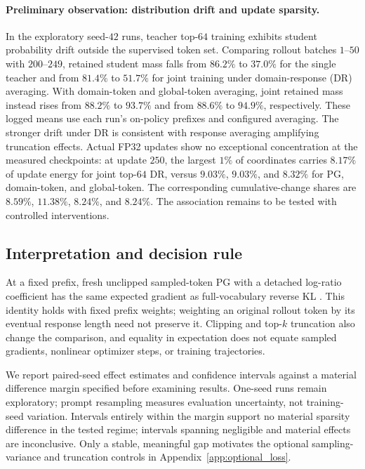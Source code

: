 \paragraph{Preliminary observation: distribution drift and update sparsity.}
In the exploratory seed-$42$ runs, teacher top-$64$ training exhibits
student probability drift outside the supervised token set. Comparing
rollout batches $1$--$50$ with $200$--$249$, retained student mass falls
from $86.2\%$ to $37.0\%$ for the single teacher and from $81.4\%$ to
$51.7\%$ for joint training under domain-response (DR) averaging.
With domain-token and global-token averaging, joint retained mass instead
rises from $88.2\%$ to $93.7\%$ and from $88.6\%$ to $94.9\%$,
respectively. These logged means use each run's on-policy prefixes and
configured averaging. The stronger drift under DR is consistent with
response averaging amplifying truncation effects. Actual FP32 updates
show no exceptional concentration at the measured checkpoints: at update
$250$, the largest $1\%$ of coordinates carries $8.17\%$ of update energy
for joint top-$64$ DR, versus $9.03\%$, $9.03\%$, and $8.32\%$ for PG,
domain-token, and global-token. The corresponding cumulative-change
shares are $8.59\%$, $11.38\%$, $8.24\%$, and $8.24\%$.
The association remains to be tested with controlled interventions.

\subsection{Interpretation and decision rule}

At a fixed prefix, fresh unclipped sampled-token PG with a detached
log-ratio coefficient has the same expected gradient as full-vocabulary
reverse KL \citep{yu2026denseupdates,oh2026vopd}. This identity holds with
fixed prefix weights; weighting an original rollout token by its eventual
response length need not preserve it. Clipping and top-$k$ truncation
also change the comparison, and equality in expectation does not equate
sampled gradients, nonlinear optimizer steps, or training trajectories.

We report paired-seed effect estimates and confidence intervals against
a material difference margin specified before examining results.
One-seed runs remain exploratory; prompt resampling measures evaluation
uncertainty, not training-seed variation. Intervals entirely within the
margin support no material sparsity difference in the tested regime;
intervals spanning negligible and material effects are inconclusive.
Only a stable, meaningful gap motivates
the optional sampling-variance and truncation controls in
Appendix~\ref{app:optional_loss}.

